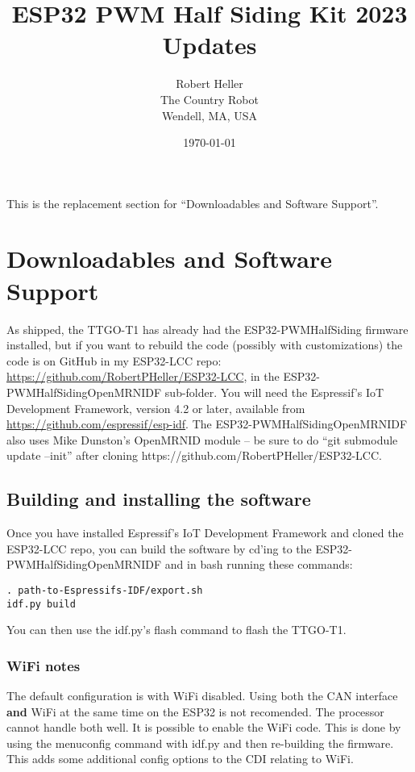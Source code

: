 \documentclass[12pt,twoside]{article}
\title{ESP32 PWM Half Siding Kit 2023 Updates}
\author{Robert Heller \\ The Country Robot \\ Wendell, MA, USA}
\date{\today}
\begin{document}
\maketitle

This is the replacement section for ``Downloadables and Software Support''.

\setcounter{section}{3}

\section{Downloadables and Software Support}

As shipped, the TTGO-T1 has already had the ESP32-PWMHalfSiding firmware
installed, but if you want to rebuild the code (possibly with customizations)
the code is on GitHub in my ESP32-LCC repo:
\url{https://github.com/RobertPHeller/ESP32-LCC}, in the
ESP32-PWMHalfSidingOpenMRNIDF sub-folder. You will need the Espressif's IoT
Development Framework, version 4.2 or later, available from
\url{https://github.com/espressif/esp-idf}. The ESP32-PWMHalfSidingOpenMRNIDF
also uses Mike Dunston's OpenMRNID module -- be sure to do ``git submodule
update --init'' after cloning https://github.com/RobertPHeller/ESP32-LCC.


\subsection{Building and installing the software}

Once you have installed Espressif's IoT Development Framework and cloned the 
ESP32-LCC repo, you can build the software by cd'ing to the 
ESP32-PWMHalfSidingOpenMRNIDF and in bash running these commands:

\begin{verbatim}
. path-to-Espressifs-IDF/export.sh
idf.py build
\end{verbatim}

You can then use the idf.py's flash command to flash the TTGO-T1.

\subsubsection{WiFi notes}

The default configuration is with WiFi disabled. Using both the CAN interface
\textbf{and} WiFi at the same time on the ESP32 is not recomended. The
processor cannot handle both well. It is possible to enable the WiFi code.
This is done by using the menuconfig command with idf.py and then re-building
the firmware. This adds some additional config options to the CDI relating to 
WiFi.
\end{document}
